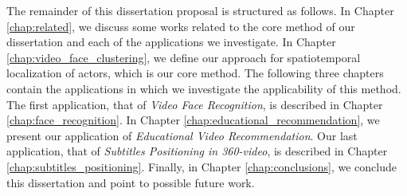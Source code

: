 The remainder of this dissertation proposal is structured as follows. 
In Chapter \ref{chap:related}, we discuss some works related to the core method of our dissertation and each of the applications we investigate.
In Chapter \ref{chap:video_face_clustering}, we define our approach for spatiotemporal localization of actors, which is our core method.
The following three chapters contain the applications in which we investigate the applicability of this method.
The first application, that of \emph{Video Face Recognition}, is described in Chapter \ref{chap:face_recognition}.
In Chapter \ref{chap:educational_recommendation}, we present our application of \emph{Educational Video Recommendation}.
Our last application, that of \emph{Subtitles Positioning in 360-video}, is described in Chapter \ref{chap:subtitles_positioning}. Finally, in Chapter \ref{chap:conclusions}, we conclude this dissertation and point to possible future work.
